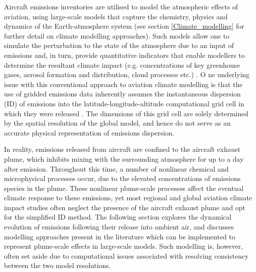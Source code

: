Aircraft emissions inventories are utilised to model the atmospheric effects of aviation, using large-scale models that capture the chemistry, physics and dynamics of the Earth-atmosphere system (see section \ref{Climate_modelling} for further detail on climate modelling approaches). Such models allow one to simulate the perturbation to the state of the atmosphere due to an input of emissions and, in turn, provide quantitative indicators that enable modellers to determine the resultant climate impact (e.g. concentrations of key greenhouse gases, aerosol formation and distribution, cloud processes etc.) \cite{Jacobson2005}. O ne underlying issue with this conventional approach to aviation climate modelling is that the use of gridded emissions data inherently assumes the instantaneous dispersion (ID) of emissions into the latitude-longitude-altitude computational grid cell in which they were released \cite{Petry1998}. The dimensions of this grid cell are solely determined by the spatial resolution of the global model, and hence do not serve as an accurate physical representation of emissions dispersion.

In reality, emissions released from aircraft are confined to the aircraft exhaust plume, which inhibits mixing with the surrounding atmosphere for up to a day after emission. Throughout this time, a number of nonlinear chemical and microphysical processes occur, due to the elevated concentrations of emissions species in the plume. These nonlinear plume-scale processes affect the eventual climate response to these emissions, yet most regional and global aviation climate impact studies \cite{Cariolle2009} often neglect the presence of the aircraft exhaust plume and opt for the simplified ID method. The following section explores the dynamical evolution of emissions following their release into ambient air, and discusses modelling approaches present in the literature which can be implemented to represent plume-scale effects in large-scale models. Such modelling is, however, often set aside due to computational issues associated with resolving consistency between the two model resolutions. 




